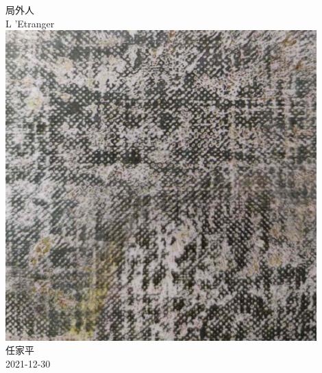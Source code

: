 \documentclass[a4paper, 12pt]{article}
\begin{document}
\begin{center}
    {\Huge 
        局外人 }\\[12pt]
    {\huge 
        L 'Etranger}\\[20pt]
    
    \includegraphics[height=12cm]{figure/cover.jpg} 
    \\[20pt] 

    {\Large 
        任家平\\[12pt]
        2021-12-30}
\end{center}
\thispagestyle{empty}



\newpage
{}

\end{document}
